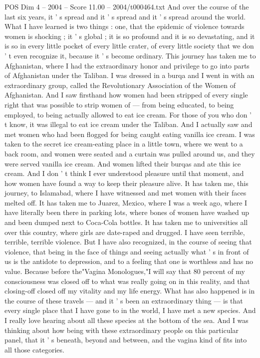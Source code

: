 \begin{textsample}{POS Dim 4 – 2004 – Score 11.00 – 2004/t000464.txt}
And over the course of the last six years, it ' s spread and it ' s spread and it ' s spread around the world.
What I have learned is two things : one, that the epidemic of violence towards women is shocking ; it ' s global ; it is so profound and it is so devastating, and it is so in every little pocket of every little crater, of every little society that we don ' t even recognize it, because it ' s become ordinary.
This journey has taken me to Afghanistan, where I had the extraordinary honor and privilege to go into parts of Afghanistan under the Taliban.
I was dressed in a burqa and I went in with an extraordinary group, called the Revolutionary Association of the Women of Afghanistan.
And I saw firsthand how women had been stripped of every single right that was possible to strip women of — from being educated, to being employed, to being actually allowed to eat ice cream.
For those of you who don ' t know, it was illegal to eat ice cream under the Taliban.
And I actually saw and met women who had been flogged for being caught eating vanilla ice cream.
I was taken to the secret ice cream-eating place in a little town, where we went to a back room, and women were seated and a curtain was pulled around us, and they were served vanilla ice cream.
And women lifted their burqas and ate this ice cream.
And I don ' t think I ever understood pleasure until that moment, and how women have found a way to keep their pleasure alive.
It has taken me, this journey, to Islamabad, where I have witnessed and met women with their faces melted off.
It has taken me to Juarez, Mexico, where I was a week ago, where I have literally been there in parking lots, where bones of women have washed up and been dumped next to Coca-Cola bottles.
It has taken me to universities all over this country, where girls are date-raped and drugged.
I have seen terrible, terrible, terrible violence.
But I have also recognized, in the course of seeing that violence, that being in the face of things and seeing actually what ' s in front of us is the antidote to depression, and to a feeling that one is worthless and has no value.
Because before the"Vagina Monologues,"I will say that 80 percent of my consciousness was closed off to what was really going on in this reality, and that closing-off closed off my vitality and my life energy.
What has also happened is in the course of these travels — and it ' s been an extraordinary thing — is that every single place that I have gone to in the world, I have met a new species.
And I really love hearing about all these species at the bottom of the sea.
And I was thinking about how being with these extraordinary people on this particular panel, that it ' s beneath, beyond and between, and the vagina kind of fits into all those categories.

\end{textsample}
